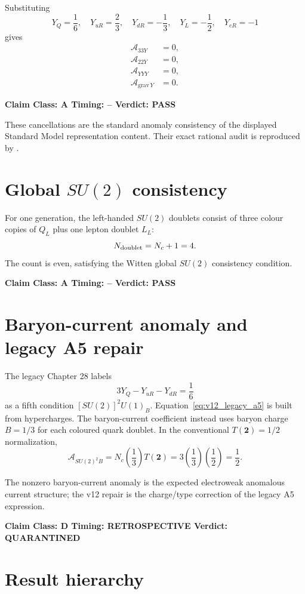 \documentclass[11pt,a4paper,twoside]{book}
\theoremstyle{definition}
\newcommand{\vTwelveStatus}[3]{\par\noindent\textbf{Claim Class: #1 \quad Timing: #2 \quad Verdict: #3}\par}
\begin{document}
Substituting
\[
Y_Q=\frac16,\quad
Y_{uR}=\frac23,\quad
Y_{dR}=-\frac13,\quad
Y_L=-\frac12,\quad
Y_{eR}=-1
\]
gives
\begin{align}
\mathcal A_{33Y}&=0,\\
\mathcal A_{22Y}&=0,\\
\mathcal A_{YYY}&=0,\\
\mathcal A_{\mathrm{grav}\,Y}&=0.
\end{align}

\vTwelveStatus{A}{--}{PASS}
These cancellations are the standard anomaly consistency of the displayed Standard Model representation content. Their exact rational audit is reproduced by
.

\section[Global SU(2) consistency]{Global $SU(2)$ consistency}

For one generation, the left-handed $SU(2)$ doublets consist of three colour copies of $Q_L$ plus one lepton doublet $L_L$:
\[
N_{\rm doublet}=N_c+1=4.
\]
The count is even, satisfying the Witten global $SU(2)$ consistency condition.
\vTwelveStatus{A}{--}{PASS}

\section{Baryon-current anomaly and legacy A5 repair}

The legacy Chapter 28 labels
\begin{equation}
3Y_Q-Y_{uR}-Y_{dR}=\frac16
\label{eq:v12_legacy_a5}
\end{equation}
as a fifth condition $[SU(2)]^2U(1)_B$. Equation~\eqref{eq:v12_legacy_a5} is built from hypercharges. The baryon-current coefficient instead uses baryon charge $B=1/3$ for each coloured quark doublet. In the conventional $T(\mathbf2)=1/2$ normalization,
\begin{equation}
\boxed{
\mathcal A_{SU(2)^2B}
=N_c\left(\frac13\right)T(\mathbf2)
=3\left(\frac13\right)\left(\frac12\right)
=\frac12.
}
\end{equation}

The nonzero baryon-current anomaly is the expected electroweak anomalous current structure; the v12 repair is the charge/type correction of the legacy A5 expression.
\vTwelveStatus{D}{RETROSPECTIVE}{QUARANTINED}

\section{Result hierarchy}
\end{document}
